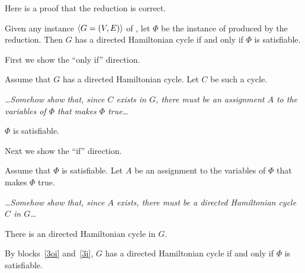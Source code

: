 \documentclass[11pt]{article}
\begin{document}
\begin{problems}
  \medskip 
  Here is a proof that the reduction is correct.
  \begin{lemma}
    Given any instance $\langle G=(V,E) \rangle$ of ,
    let $\Phi$ be the instance of  produced by the reduction.
    Then $G$ has a directed Hamiltonian cycle 
    if and only if $\Phi$ is satisfiable.
  \end{lemma}
  \begin{longFormProof}
    \step First we show the ``only if'' direction.
    \begin{block}[3oi]
      {Assume that $G$ has a directed Hamiltonian cycle.}
      \step Let $C$ be such a cycle.
      \smallskip 

      \emph{\ldots Somehow show that, since $C$ exists in $G$,
        there must be an assignment $A$ to the variables of $\Phi$
        that makes $\Phi$ true\ldots}

      \smallskip 
      \step $\Phi$ is satisfiable.
    \end{block} 
    \step Next we show the ``if'' direction.
    \begin{block}[3i]
      {Assume that $\Phi$ is satisfiable.}
      \step Let $A$ be an assignment to the variables of $\Phi$ that makes $\Phi$ true.
      \smallskip 
      
      \emph{\ldots Somehow show that, since $A$ exists,
        there must be a directed Hamiltonian cycle $C$ in $G$\ldots}

      \smallskip 
      \step There is an directed Hamiltonian cycle in $G$.
    \end{block} 
    \step By blocks~\ref{3oi} and~\ref{3i},
    $G$ has a directed Hamiltonian cycle
    if and only if $\Phi$ is satisfiable.
  \end{longFormProof}


\end{problems}
\end{document}
